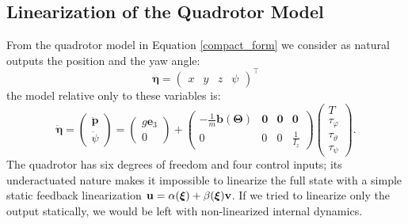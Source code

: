 \documentclass[10pt, a4paper]{report}
\begin{document}
\subsection{Linearization of the Quadrotor Model}
From the quadrotor model in Equation \eqref{compact_form} we consider as natural outputs the position and the yaw angle:\begin{equation}
    \boldsymbol{\eta}=\begin{pmatrix}
        x&y&z&\psi
    \end{pmatrix}^\top 
\end{equation}
the model relative only to these variables is:\begin{equation}\label{compact_model_2}
    \ddot{\boldsymbol{\eta}}=\begin{pmatrix}
        \ddot{\mathbf p}\\ \ddot\psi 
    \end{pmatrix}=\begin{pmatrix}
        g\mathbf e_3\\ 0
    \end{pmatrix}+\begin{pmatrix}
        -\frac{1}{m}\mathbf b(\boldsymbol{\Theta})&\mathbf 0&\mathbf 0&\mathbf 0\\ 
        0&0&0&\frac{1}{I_z}
    \end{pmatrix}\begin{pmatrix}
        T\\ \tau_\varphi\\\tau_\vartheta\\\tau_\psi 
    \end{pmatrix}.
\end{equation}
The quadrotor has six degrees of freedom and four control inputs; its underactuated nature makes it impossible to linearize the full state with a simple static feedback linearization $\mathbf u=\alpha({\boldsymbol{\xi}})+\beta({\boldsymbol{\xi}})\mathbf v$. If we tried to linearize only the output statically, we would be left with non-linearized internal dynamics.
\end{document}
